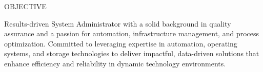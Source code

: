 \documentclass{resume} %
\begin{document}

\begin{rSection}{OBJECTIVE}

{Results-driven System Administrator with a solid background in quality assurance and a passion for automation, infrastructure management, and process optimization. Committed to leveraging expertise in automation, operating systems, and storage technologies to deliver impactful, data-driven solutions that enhance efficiency and reliability in dynamic technology environments.}

\end{rSection}


\end{document}
